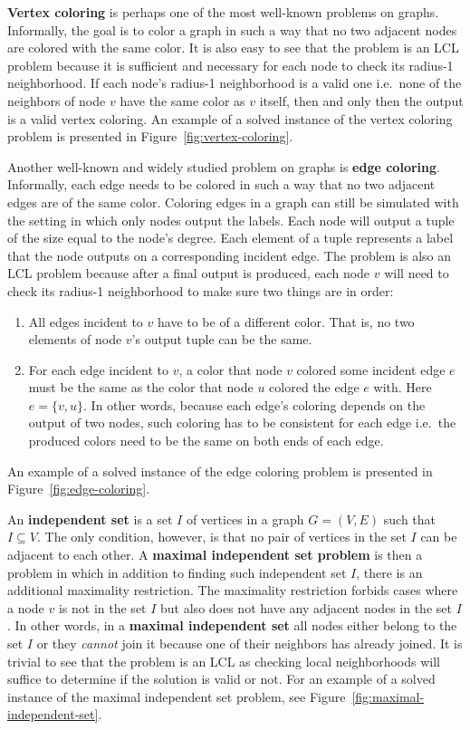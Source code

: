 \textbf{Vertex coloring} is perhaps one of the most well-known
problems on graphs. Informally, the goal is to color a graph
in such a way that no two adjacent nodes are colored with the
same color. It is also easy to see that the problem is an
LCL problem because it is sufficient and necessary for each node to check
its radius-1 neighborhood. If each node's radius-1 neighborhood is
a valid one i.e.\ none of the neighbors of node $v$ have the same color as $v$
itself, then and only then the output is a valid vertex coloring.
An example of a solved instance of the vertex coloring problem
is presented in Figure~\ref{fig:vertex-coloring}.

Another well-known and widely studied problem on graphs is
\textbf{edge coloring}. Informally, each edge needs to be
colored in such a way that no two adjacent edges are of the same
color. Coloring edges in a graph can still be simulated
with the setting in which only nodes output the labels.
Each node will output a tuple of the size equal to the node's
degree. Each element of a tuple represents a label
that the node outputs on a corresponding incident edge. The problem
is also an LCL problem because after a final output is
produced, each node $v$ will need to check its radius-1
neighborhood to make sure two things are in order:
\begin{enumerate}
  \item All edges incident to $v$ have to be of a different color.
That is, no two elements of node $v$'s output tuple can be the same.

  \item For each edge incident to $v$, a color that node $v$ colored some incident
edge $e$ must be the same as the color that node $u$ colored the edge $e$ with.
Here $e = \{v, u\}$. In other words, because each edge's coloring depends on the
output of two nodes, such coloring has to be consistent for each edge i.e.\ the produced
colors need to be the same on both ends of each edge.
\end{enumerate}
An example of a solved instance of the edge coloring problem
is presented in Figure~\ref{fig:edge-coloring}.

An \textbf{independent set} is a set $I$ of vertices in a graph $G = (V, E)$ such that
$I \subseteq V$. The only condition, however, is that no pair of vertices in the set $I$
can be adjacent to each other. A \textbf{maximal independent set problem} is then a
problem in which in addition to finding such independent set $I$, there is an additional
maximality restriction. The maximality restriction forbids cases where a node $v$
is not in the set $I$ but also does not have any adjacent nodes in the set $I$.
In other words, in a \textbf{maximal independent set} all nodes either belong
to the set $I$ or they \emph{cannot} join it because one of their neighbors has
already joined. It is trivial to see that the problem is an LCL as checking local
neighborhoods will suffice to determine if the solution is valid or not.
For an example of a solved instance of the maximal
independent set problem, see Figure~\ref{fig:maximal-independent-set}.

